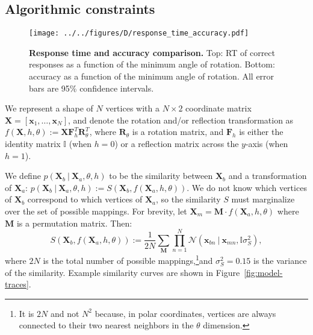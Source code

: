 \documentclass[10pt,letterpaper]{article}
\newcommand{\Xa}[0]{\mathbf{X}_a}
\newcommand{\Xb}[0]{\mathbf{X}_b}
\newcommand{\R}[0]{\mathbf{R}_\theta}
\newcommand{\F}[0]{\mathbf{F}}
\newcommand{\M}[0]{\mathbf{M}}
\newcommand{\I}[0]{\mathbb{I}}
\newcommand{\hi}[0]{h=0}
\newcommand{\hf}[0]{h=1}
\begin{document}
\subsection{Algorithmic constraints}

\begin{figure*}[t]
  \begin{center}
    \texttt{[image: ../../figures/D/response\_time\_accuracy.pdf]}
    \caption{\textbf{Response time and accuracy comparison.} Top: RT
      of correct responses as a function of the minimum angle of
      rotation. Bottom: accuracy as a function of the minimum angle of
      rotation. All error bars are 95\% confidence intervals.}
    \label{fig:response-time-accuracy}
  \end{center}
\end{figure*}

We represent a shape of $N$ vertices with a $N\times 2$ coordinate
matrix $\mathbf{X}=[\mathbf{x}_1, \ldots{}, \mathbf{x}_N]$, and denote
the rotation and/or reflection transformation as $f(\mathbf{X}, h,
\theta):=\mathbf{X}\F_h^T\R^T$, where $\R$ is a rotation matrix, and
$\F_h$ is either the identity matrix $\I$ (when $\hi$) or a reflection
matrix across the $y$-axis (when $\hf$).

We define $p(\Xb\ \vert\ \Xa, \theta, h)$ to be the similarity between
$\Xb$ and a transformation of $\Xa$: $p(\Xb\ \vert\ \Xa, \theta, h):=
S(\Xb, f(\Xa, h, \theta))$.  We do not know which vertices of $\Xb$
correspond to which vertices of $\Xa$, so the similarity $S$ must
marginalize over the set of possible mappings. For brevity, let
$\mathbf{X}_m=\M\cdot{}f(\Xa, h, \theta)$ where $\M$ is a permutation
matrix. Then:
\begin{equation}
  S(\Xb, f(\Xa, h, \theta)):=\frac{1}{2N} \sum_{\M} \prod_{n=1}^N \mathcal{N}(\mathbf{x}_{bn}\ \vert \ \mathbf{x}_{mn}, \I\sigma_S^2),
  \label{eq:similarity}
\end{equation}
where $2N$ is the total number of possible mappings,\footnote{It is
  $2N$ and not $N^2$ because, in polar coordinates, vertices are
  always connected to their two nearest neighbors in the $\theta$
  dimension.}and $\sigma_S^2=0.15$ is the variance of the
similarity. Example similarity curves are shown in
Figure~\ref{fig:model-traces}.
\end{document}
